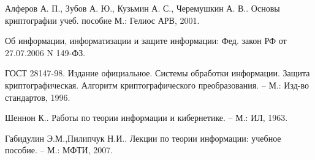 \begin{thebibliography}{99}

 Алферов А. П., Зубов А. Ю., Кузьмин А. С., Черемушкин А. В.. Основы криптографии учеб. пособие М.: Гелиос АРВ, 2001.

Об информации, информатизации и защите информации: Фед. закон РФ  от 27.07.2006 N 149-ФЗ.

ГОСТ 28147-98. Издание официальное. Системы обработки информации. Защита криптографическая. Алгоритм криптографического преобразования. -- М.: Изд-во стандартов, 1996.

Шеннон К.. Работы по теории информации и кибернетике. -- М.: ИЛ, 1963.

Габидулин Э.М.,Пилипчук Н.И.. Лекции по теории информации: учебное пособие. -- М.: МФТИ, 2007.

\end{thebibliography}
